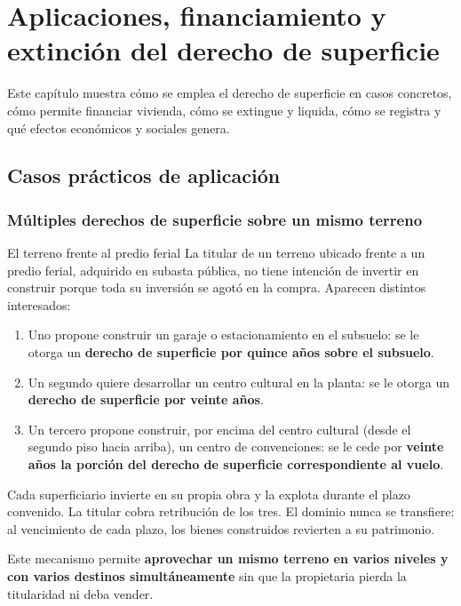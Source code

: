 \documentclass[12pt,oneside]{book}
\begin{document}
\chapter{Aplicaciones, financiamiento y extinción del derecho de superficie}
\label{cap:superficieaplic}

Este capítulo muestra cómo se emplea el derecho de superficie en casos concretos, cómo permite financiar vivienda, cómo se extingue y liquida, cómo se registra y qué efectos económicos y sociales genera.

\section{Casos prácticos de aplicación}

\subsection{Múltiples derechos de superficie sobre un mismo terreno}

\begin{example}{El terreno frente al predio ferial}
La titular de un terreno ubicado frente a un predio ferial, adquirido en subasta pública, no tiene intención de invertir en construir porque toda su inversión se agotó en la compra. Aparecen distintos interesados:
\begin{enumerate}
    \item Uno propone construir un garaje o estacionamiento en el subsuelo: se le otorga un \textbf{derecho de superficie por quince años sobre el subsuelo}.
    \item Un segundo quiere desarrollar un centro cultural en la planta: se le otorga un \textbf{derecho de superficie por veinte años}.
    \item Un tercero propone construir, por encima del centro cultural (desde el segundo piso hacia arriba), un centro de convenciones: se le cede por \textbf{veinte años la porción del derecho de superficie correspondiente al vuelo}.
\end{enumerate}
Cada superficiario invierte en su propia obra y la explota durante el plazo convenido. La titular cobra retribución de los tres. El dominio nunca se transfiere: al vencimiento de cada plazo, los bienes construidos revierten a su patrimonio.
\end{example}

Este mecanismo permite \textbf{aprovechar un mismo terreno en varios niveles y con varios destinos simultáneamente} sin que la propietaria pierda la titularidad ni deba vender.
\end{document}
